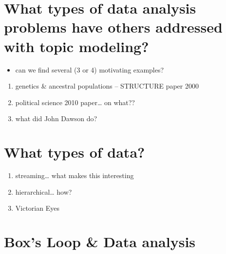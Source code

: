 \documentclass[12pt,]{article}
\providecommand{\tightlist}{%
  \setlength{\itemsep}{0pt}\setlength{\parskip}{0pt}}
\begin{document}

\section{What types of data analysis problems have others addressed with
topic
modeling?}\label{what-types-of-data-analysis-problems-have-others-addressed-with-topic-modeling}

\begin{itemize}
\tightlist
\item
  can we find several (3 or 4) motivating examples?
\end{itemize}

\begin{enumerate}
\def\labelenumi{\arabic{enumi}.}
\tightlist
\item
  genetics \& ancestral populations -- STRUCTURE paper 2000
\item
  political science 2010 paper\ldots{} on what??
\item
  what did John Dawson do?
\end{enumerate}

\section{What types of data?}\label{what-types-of-data}

\begin{enumerate}
\def\labelenumi{\arabic{enumi}.}
\tightlist
\item
  streaming\ldots{} what makes this interesting
\item
  hierarchical\ldots{} how?
\item
  Victorian Eyes
\end{enumerate}

\section{Box's Loop \& Data analysis}\label{boxs-loop-data-analysis}


\end{document}
